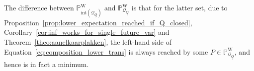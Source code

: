 \documentclass[10pt,a4paper]{paper}
\theoremstyle{definition}
\newtheorem{proposition}[theorem]{Proposition}
\newcommand{\reals}{\mathbb{R}}
\newcommand{\realsnonneg}{\reals_{\geq 0}}
\newcommand{\states}{\mathcal{X}}
\newcommand{\processes}{\mathbb{P}}
\newcommand{\wprocesses}{\processes^{\mathrm{W}}}
\newcommand{\wmprocesses}{\processes^{\mathrm{WM}}}
\newcommand{\gambles}{\mathcal{L}}
\newcommand{\rateset}{\mathcal{Q}}
\newcommand{\lrate}{\underline{Q}}
\begin{document}
The difference between $\wprocesses_{\text{int}(\rateset_{\lrate})}$ and $\wprocesses_{\rateset_{\lrate}}$ is that for the latter set, due to Proposition~\ref{prop:lower_expectation_reached_if_Q_closed}, Corollary~\ref{cor:inf_works_for_single_future_var} and Theorem~\ref{theo:aanelkaarplakken}, the left-hand side of Equation~\eqref{eq:composition_lower_trans} is always reached by some $P\in\wprocesses_{\rateset_{\lrate}}$, and hence is in fact a minimum.

%
%
%
\end{document}
